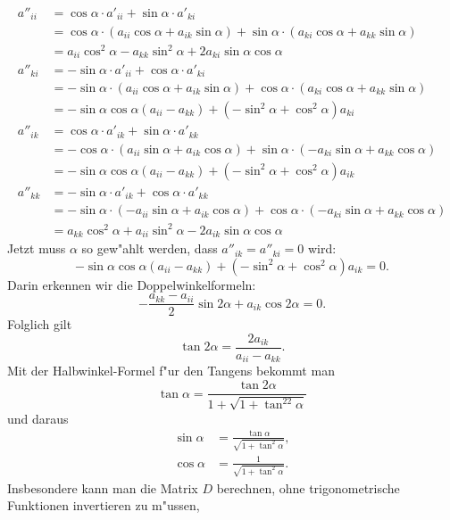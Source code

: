 \begin{equation}
\begin{aligned}
a''_{ii}&=\cos\alpha \cdot a'_{ii}+\sin\alpha \cdot a'_{ki}\\
        &=\cos\alpha\cdot (a_{ii}\cos\alpha+a_{ik}\sin\alpha)
         +\sin\alpha\cdot (a_{ki}\cos\alpha+a_{kk}\sin\alpha)\\
        &=a_{ii}\cos^2\alpha-a_{kk}\sin^2\alpha+2a_{ki}\sin\alpha\cos\alpha
\\
a''_{ki}&=-\sin\alpha \cdot a'_{ii}+\cos\alpha \cdot a'_{ki}\\
        &=-\sin\alpha\cdot (a_{ii}\cos\alpha+a_{ik}\sin\alpha)
         +\cos\alpha\cdot (a_{ki}\cos\alpha+a_{kk}\sin\alpha)\\
        &=-\sin\alpha\cos\alpha(a_{ii}-a_{kk})
        +(-\sin^2\alpha+\cos^2\alpha)a_{ki}
\\
a''_{ik}&=\cos\alpha \cdot a'_{ik} +\sin\alpha \cdot a'_{kk}\\
        &=-\cos\alpha\cdot (a_{ii}\sin\alpha+a_{ik}\cos\alpha)
         +\sin\alpha\cdot (-a_{ki}\sin\alpha+a_{kk}\cos\alpha)\\
        &=-\sin\alpha\cos\alpha(a_{ii}-a_{kk})
        +(-\sin^2\alpha+\cos^2\alpha)a_{ik}
\\
a''_{kk}&=-\sin\alpha \cdot a'_{ik}+\cos\alpha \cdot a'_{kk}\\
        &=-\sin\alpha\cdot (-a_{ii}\sin\alpha+a_{ik}\cos\alpha)
         +\cos\alpha\cdot (-a_{ki}\sin\alpha+a_{kk}\cos\alpha)\\
        &=a_{kk}\cos^2\alpha+a_{ii}\sin^2\alpha-2a_{ik}\sin\alpha\cos\alpha
\end{aligned}
\label{dtad3}
\end{equation}
Jetzt muss $\alpha$ so gew"ahlt werden, dass $a''_{ik}=a''_{ki}=0$
wird:
\[
-\sin\alpha\cos\alpha(a_{ii}-a_{kk}) +(-\sin^2\alpha+\cos^2\alpha)a_{ik}=0.
\]
Darin erkennen wir die Doppelwinkelformeln:
\[
-\frac{a_{kk}-a_{ii}}2 \sin2\alpha +a_{ik}\cos2\alpha=0.
\]
Folglich gilt 
\begin{equation}
\tan2\alpha=\frac{2a_{ik}}{a_{ii}-a_{kk}}.
\label{tan2alpha1}
\end{equation}
Mit der Halbwinkel-Formel f"ur den Tangens bekommt man 
\begin{equation}
\tan\alpha=\frac{\tan2\alpha}{1+\sqrt{1+\tan^22\alpha}}
\label{tan2alpha2}
\end{equation}
und daraus
\begin{align}
\sin\alpha
&=
\frac{\tan\alpha}{\sqrt{1+\tan^2\alpha}},
\\
\cos\alpha
&=
\frac{1}{\sqrt{1+\tan^2\alpha}}.
\label{tan2alpha3}
\end{align}
Insbesondere kann man die Matrix $D$ berechnen, ohne trigonometrische
Funktionen invertieren zu m"ussen, 

